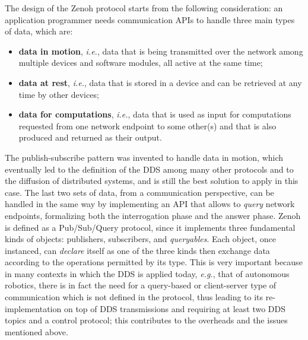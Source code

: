 The design of the Zenoh protocol starts from the following consideration: an application programmer needs communication APIs to handle three main types of data, which are:
\begin{itemize}
  \item \textbf{data in motion}, \emph{i.e.}, data that is being transmitted over the network among multiple devices and software modules, all active at the same time;
  \item \textbf{data at rest}, \emph{i.e.}, data that is stored in a device and can be retrieved at any time by other devices;
  \item \textbf{data for computations}, \emph{i.e.}, data that is used as input for computations requested from one network endpoint to some other(s) and that is also produced and returned as their output.
\end{itemize}
The publish-subscribe pattern was invented to handle data in motion, which eventually led to the definition of the DDS among many other protocols and to the diffusion of distributed systems, and is still the best solution to apply in this case. The last two sets of data, from a communication perspective, can be handled in the same way by implementing an API that allows to \emph{query} network endpoints, formalizing both the interrogation phase and the answer phase. Zenoh is defined as a Pub/Sub/Query protocol, since it implements three fundamental kinds of objects: publishers, subscribers, and \emph{queryables}. Each object, once instanced, can \emph{declare} itself as one of the three kinds then exchange data according to the operations permitted by its type. This is very important because in many contexts in which the DDS is applied today, \emph{e.g.}, that of autonomous robotics, there is in fact the need for a query-based or client-server type of communication which is not defined in the protocol, thus leading to its re-implementation on top of DDS transmissions and requiring at least two DDS topics and a control protocol; this contributes to the overheads and the issues mentioned above.

